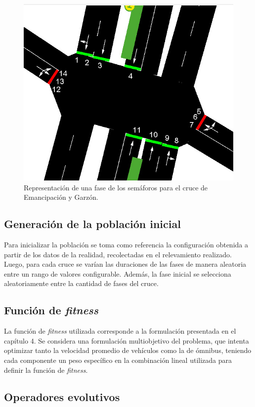 \begin{figure}[H]
	\centering
	\includegraphics[width=0.7\linewidth]{Figures/semaforos_numerado}
	\caption[Representación de una fase de los semáforos para un cruce.]{Representación de una fase de los semáforos para el cruce de Emancipación y Garzón.}
	\label{fig:sem_numerados}
\end{figure}

\subsection{Generación de la población inicial}

Para inicializar la población se toma como referencia la configuración obtenida a partir de los datos de la realidad, recolectadas en el relevamiento realizado. Luego, para cada cruce se varían las duraciones de las fases de manera aleatoria entre un rango de valores configurable. Además, la fase inicial se selecciona aleatoriamente entre la cantidad de fases del cruce.

\subsection{Función de \emph{fitness}}

La función de \emph{fitness} utilizada corresponde a la formulación presentada en el capítulo 4. Se considera una formulación multiobjetivo del problema, que intenta optimizar tanto la velocidad promedio de vehículos como la de ómnibus, teniendo cada componente un peso específico en la combinación lineal utilizada para definir la función de \emph{fitness}. 

\subsection{Operadores evolutivos}


